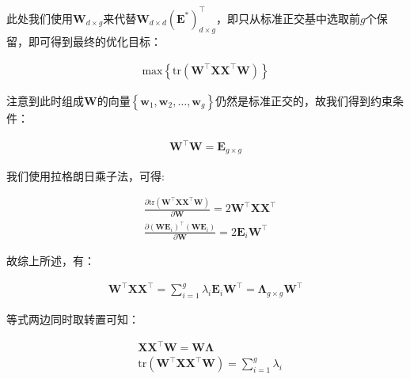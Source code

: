 \documentclass[UTF8]{book}
\begin{document}
此处我们使用$\mathbf{W}_{d\times g}$来代替$\mathbf{W}_{d\times d}(\mathbf{E}^*)^\top_{d\times g}$，即只从标准正交基中选取前$g$个保留，即可得到最终的优化目标：
\begin{large}
    \begin{equation}
        \begin{aligned}
            \mathrm{max} \left\{ \mathrm{tr}\left( \mathbf{W}^\top\mathbf{X}\mathbf{X}^\top\mathbf{W} \right) \right\}
            \nonumber
        \end{aligned}
    \end{equation}
\end{large}
注意到此时组成$\mathbf{W}$的向量$\left\{\mathbf{w}_1,\mathbf{w}_2,\dots,\mathbf{w}_g \right\}$仍然是标准正交的，故我们得到约束条件：
\begin{large}
    \begin{equation}
        \begin{aligned}
            \mathbf{W}^\top\mathbf{W}=\mathbf{E}_{g\times g}
            \nonumber
        \end{aligned}
    \end{equation}
\end{large}
我们使用拉格朗日乘子法，可得:
\begin{large}
    \begin{equation}
        \begin{aligned}
            &\frac{\partial \mathrm{tr}\left( \mathbf{W}^\top\mathbf{X}\mathbf{X}^\top\mathbf{W} \right)}{\partial \mathbf{W}}
            = 2\mathbf{W}^\top\mathbf{X}\mathbf{X}^\top \\
            &\frac{\partial (\mathbf{W}\mathbf{E}_i)^\top(\mathbf{W}\mathbf{E}_i)}{\partial \mathbf{W}} = 2\mathbf{E}_i\mathbf{W}^\top
            \nonumber
        \end{aligned}
    \end{equation}
\end{large}
故综上所述，有：
\begin{large}
    \begin{equation}
        \begin{aligned}
            \mathbf{W}^\top\mathbf{X}\mathbf{X}^\top = \sum_{i=1}^{g} \lambda_i \mathbf{E}_i\mathbf{W}^\top = \mathbf{\Lambda}_{g\times g} \mathbf{W}^\top
            \nonumber
        \end{aligned}
    \end{equation}
\end{large}
等式两边同时取转置可知：
\begin{large}
    \begin{equation}
        \begin{aligned}
            &\mathbf{X}\mathbf{X}^\top\mathbf{W} = \mathbf{W}\mathbf{\Lambda} \\
            &\mathrm{tr}\left(\mathbf{W}^\top\mathbf{X}\mathbf{X}^\top\mathbf{W} \right) = \sum_{i=1}^{g}\lambda_i
            \nonumber
        \end{aligned}
    \end{equation}
\end{large}
\end{document}

